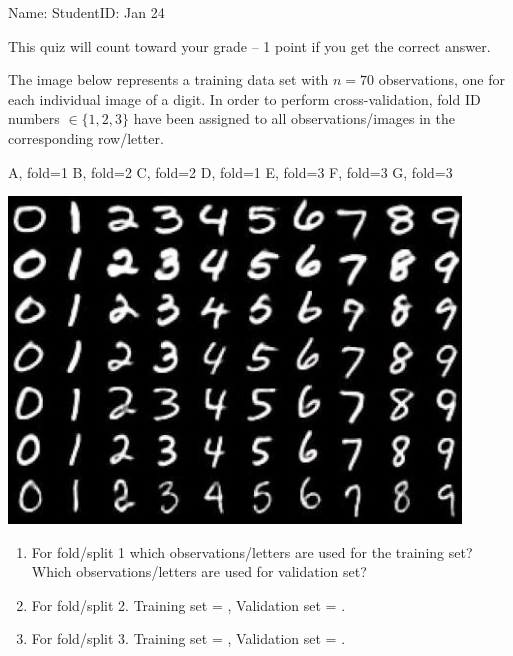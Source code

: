 \documentclass{article}[12pt]
\begin{document}
\thispagestyle{empty}


Name: \underline{\hspace{2in}} StudentID: \underline{\hspace{2in}} Jan 24

This quiz will count toward your grade -- 1 point if you get the
correct answer.

The image below represents a training data set with $n=70$
observations, one for each individual image of a digit. In order to
perform cross-validation, fold ID numbers $\in\{1,2,3\}$ have been
assigned to all observations/images in the corresponding row/letter.


\newcommand{\myskip}{\vskip 0.8cm}
\parbox{0.1\textwidth}{
A, fold=1
\myskip
B, fold=2
\myskip
C, fold=2
\myskip
D, fold=1
\myskip
E, fold=3
\myskip
F, fold=3
\myskip
G, fold=3
}
\parbox{0.9\textwidth}{
  \includegraphics[width=0.9\textwidth]{mnist-digits}
}

\begin{enumerate}
\vskip 1cm
\item For fold/split 1 which observations/letters are used for the
  training set?  \underline{\hspace{1.5in}} Which observations/letters
  are used for validation set? \underline{\hspace{1.5in}}

\vskip 1cm
\item For fold/split 2. Training set = \underline{\hspace{1.5in}},
  Validation set = \underline{\hspace{1.5in}}.

\vskip 1cm
\item For fold/split 3. Training set = \underline{\hspace{1.5in}},
  Validation set = \underline{\hspace{1.5in}}.
\end{enumerate}
\end{document}
